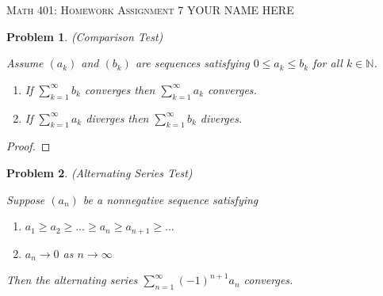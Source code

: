 \documentclass[12pt]{article}
\newtheorem{problem}{Problem}
\newcommand{\NN}{\ensuremath{\mathbb N}}
\newcommand{\ds}{\displaystyle}
\begin{document}
\small
\noindent \textsc{Math 401: Homework Assignment 7} \hfill YOUR NAME HERE

\normalsize
\bigskip

\setcounter{problem}{43}

\begin{problem} %
(Comparison Test)

\medskip
\noindent Assume $(a_k)$ and $(b_k)$ are sequences satisfying $0\le a_k \le b_k$ for all $k\in\NN$.

\renewcommand{\labelenumi}{\emph{(\roman{enumi})}}
\begin{enumerate}
\item If $\sum_{k=1}^\infty b_k$ converges then $\sum_{k=1}^\infty a_k$ converges.
\item If $\sum_{k=1}^\infty a_k$ diverges then $\sum_{k=1}^\infty b_k$ diverges.
\end{enumerate}
\end{problem}


\begin{proof}
\end{proof}


\begin{problem} %
(Alternating Series Test)

\medskip
\noindent Suppose $(a_n)$ be a \emph{nonnegative} sequence satisfying
\renewcommand{\labelenumi}{\emph{(\roman{enumi})}}
\begin{enumerate}
\item $a_1 \ge a_2 \ge \dots \ge a_n \ge a_{n+1} \ge \dots$
\item $a_n \to 0$ as $n\to\infty$
\end{enumerate}
Then the alternating series $\ds \sum_{n=1}^\infty (-1)^{n+1} a_n$ converges.
\end{problem}

\end{document}
